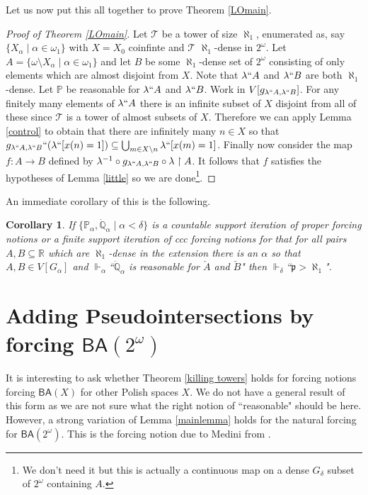 \documentclass[leqno,11pt]{amsart}
\newtheorem{corollary}[theorem]{Corollary}
\theoremstyle{definition}
\theoremstyle{remark}
\def\hook{\upharpoonright}
\def\forces{\Vdash}
\def\BA{\mathsf{BA}}
\def\Q{\mathbb Q}
\def\P{\mathbb P}
\def\mfp{\mathfrak{p}}
\begin{document}
Let us now put this all together to prove Theorem \ref{LOmain}.

\begin{proof}[Proof of Theorem \ref{LOmain}]
Let $\mathcal T$ be a tower of size $\aleph_1$, enumerated as, say $\{X_\alpha\; | \; \alpha \in \omega_1\}$ with $X = X_0$ coinfinte and $\mathcal T$ $\aleph_1$-dense in $2^\omega$. Let $A = \{\omega \setminus X_\alpha \mid \alpha \in \omega_1\}$ and let $B$ be some $\aleph_1$-dense set of $2^\omega$ consisting of only elements which are almost disjoint from $X$. Note that $\lambda``A$ and $\lambda``B$ are both $\aleph_1$-dense. Let $\P$ be reasonable for $\lambda``A$ and $\lambda``B$. Work in $V[g_{\lambda``A, \lambda``B}]$. For any finitely many elements of $\lambda``A$ there is an infinite subset of $X$ disjoint from all of these since $\mathcal T$ is a tower of almost subsets of $X$. Therefore we can apply Lemma \ref{control} to obtain that there are infinitely many $n \in X$ so that $g_{\lambda ``A, \lambda ``B} ``(\lambda``[x(n) = 1]) \subseteq \bigcup_{m \in X \setminus n} \lambda ``[x(m) = 1]$. Finally now consider the map $f:A \to B$ defined by $\lambda^{-1} \circ g_{\lambda``A, \lambda``B} \circ \lambda \hook A$. It follows that $f$ satisfies the hypotheses of Lemma \ref{little} so we are done\footnote{We don't need it but this is actually a continuous map on a dense $G_\delta$ subset of $2^\omega$ containing $A$.}. 
    
\end{proof}

An immediate corollary of this is the following.
\begin{corollary}
    If $\{\P_\alpha, \dot{\Q}_\alpha \mid \alpha < \delta\}$ is a countable support iteration of proper forcing notions or a finite support iteration of ccc forcing notions for that for all pairs $A, B \subseteq \mathbb R$ which are $\aleph_1$-dense in the extension there is an $\alpha$ so that $A, B \in V[G_\alpha]$ and  $\forces_\alpha$``$\dot{\Q}_\alpha$ is reasonable for $\check{A}$ and $\check{B}$" then $\forces_\delta$``$\mfp > \aleph_1$".
\end{corollary}

\section{Adding Pseudointersections by forcing $\BA (2^\omega)$}

It is interesting to ask whether Theorem \ref{killing towers} holds for forcing notions forcing $\BA (X)$ for other Polish spaces $X$. We do not have a general result of this form as we are not sure what the right notion of ``reasonable" should be here. However, a strong variation of Lemma \ref{mainlemma} holds for the natural forcing for $\BA (2^\omega)$. This is the forcing notion due to Medini from \cite[p. 139]{Medini15}. 
\end{document}
